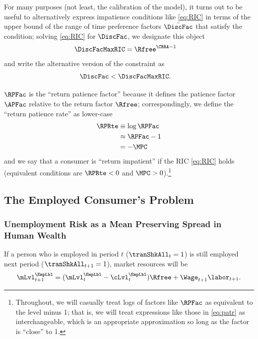\documentclass{econark}
\begin{document}
For many purposes (not least, the calibration of the model), it turns out to be useful to alternatively express
impatience conditions like \eqref{eq:RIC} in terms of the upper bound of the range of time preference
factors $\bar{\DiscFac}$ that satisfy the condition; solving \eqref{eq:RIC} for $\DiscFac$, we designate this 
object 
\begin{equation}\begin{gathered}\begin{aligned}
  \DiscFacMaxRIC & =  \Rfree^{\CRRA-1}
\end{aligned}\end{gathered}\end{equation}
and write the alternative version of the constraint as 
\begin{equation}\begin{gathered}\begin{aligned}
  \DiscFac & <  \DiscFacMaxRIC \label{eq:DiscountMaxRIC}.
\end{aligned}\end{gathered}\end{equation}

$\RPFac$ is the ``return patience factor'' because it defines the patience factor $\APFac$
relative to the return factor $\Rfree$; correspondingly, we define the ``return
patience rate'' as lower-case
\begin{equation}\begin{gathered}\begin{aligned}
   \RPRte & \equiv   \log \RPFac \label{eq:patr}
\\ & \approx \RPFac - 1 
\\ & =  -\MPC
\end{aligned}\end{gathered}\end{equation}
and we say that a consumer is ``return impatient'' if the RIC \eqref{eq:RIC} holds (equivalent conditions are $\RPRte < 0$ and $\MPC > 0$).\footnote{Throughout, we will casually treat logs of factors like $\RPFac$ as equivalent to the level minus 1; that is, we will treat expressions like those in \eqref{eq:patr} as interchangeable, which is an appropriate approximation so long as the factor is ``close'' to 1.}

\subsection{The Employed Consumer's Problem}

\subsubsection{Unemployment Risk as a Mean Preserving Spread in Human Wealth} \label{subsubsec:uMPS}
If a person who is employed in period $t$ ($\tranShkAll_{t}=1$) is still employed next
period ($\tranShkAll_{t+1}=1$), market resources will be
\begin{equation}
\mLvl^{\EmpLbl}_{t+1} = (\mLvl^{\EmpLbl}_{t}-\cLvl^{\EmpLbl}_{t})\Rfree+\Wage_{t+1}\labor_{t+1}. \label{eq:MLevtp1}
\end{equation}
\end{document}

